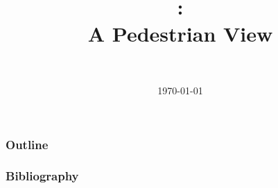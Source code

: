 \documentclass[ ]{beamer}
\title[\pdes]{\pdes:\\A Pedestrian View}
\author[Daniel Topa]{\TopaHII \\ \TopaHIIEmail}
\institute{\missiontech}
\date{\today}
\begin{document}
\begin{frame}
    \titlepage
\end{frame}

\begin{frame}[ allowframebreaks ]\frametitle{Outline}
	\tableofcontents[ hideallsubsections ]
\end{frame}

	
	
	
	
	

\begin{frame}[allowframebreaks]
    \frametitle{Bibliography}
    \nocite{*}
    \printbibliography
\end{frame}

\begin{frame}
    \titlepage
\end{frame}
\end{document}
